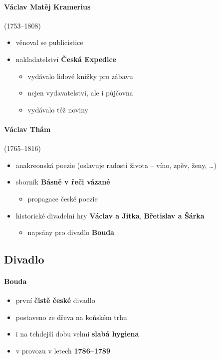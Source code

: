 \paragraph{Václav Matěj Kramerius} (1753--1808)
	\begin{itemize}
	\item věnoval se publicistice
	\item nakladatelství \textbf{Česká Expedice}
		\begin{itemize}
		\item vydávalo lidové knížky pro zábavu
		\item nejen vydavatelství, ale i půjčovna
		\item vydávalo též noviny
		\end{itemize}
	\end{itemize}

\paragraph{Václav Thám} (1765--1816)
\begin{itemize}
\item anakreonská poezie (oslavuje radosti života -- víno, zpěv, ženy, \ldots)
\item sborník \textbf{Básně v řeči vázané}
	\begin{itemize}
	\item propagace české poezie
	\end{itemize}
\item historické divadelní hry \textbf{Václav a Jitka}, \textbf{Břetislav a Šárka}
	\begin{itemize}
	\item napsány pro divadlo \textbf{Bouda}
	\end{itemize}
\end{itemize}

\subsection{Divadlo}
\paragraph{Bouda}
\begin{itemize}
\item první \textbf{čistě české} divadlo
\item postaveno ze dřeva na koňském trhu 
\item i na tehdejší dobu velmi \textbf{slabá hygiena}
\item v provozu v letech \textbf{1786--1789}
\end{itemize}

